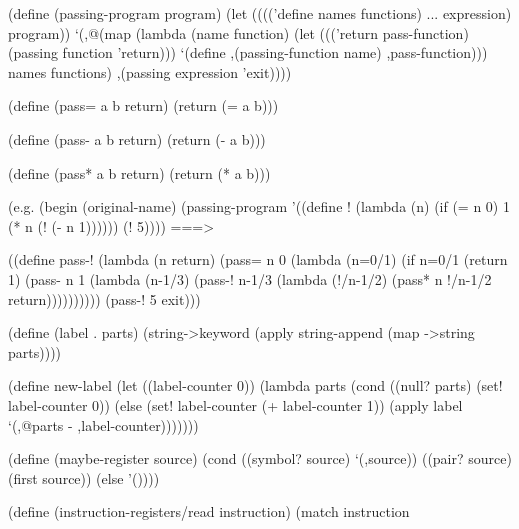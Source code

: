 \begin{Snippet}
(define (passing-program program)
  (let (((('define names functions) ... expression) program))
    `(,@(map (lambda (name function)
	       (let ((('return pass-function) (passing function 'return)))
		 `(define ,(passing-function name) ,pass-function)))
	     names functions)
      ,(passing expression 'exit))))
\end{Snippet}
\begin{Snippet}
(define (pass= a b return)
  (return (= a b)))
\end{Snippet}
\begin{Snippet}
(define (pass- a b return)
  (return (- a b)))
\end{Snippet}
\begin{Snippet}
(define (pass* a b return)
  (return (* a b)))
\end{Snippet}
\begin{Snippet}
(e.g.
 (begin
   (original-name)
   (passing-program '((define !
			(lambda (n)
			  (if (= n 0)
			      1
			      (* n (! (- n 1))))))
		      (! 5))))
 ===>
\end{Snippet}
\begin{Snippet}
 ((define pass-!
    (lambda (n return)
      (pass= n
	     0
	     (lambda (n=0/1)
	       (if n=0/1
		   (return 1)
		   (pass- n
			  1
			  (lambda (n-1/3)
			    (pass-!
			     n-1/3
			     (lambda (!/n-1/2)
			       (pass* n !/n-1/2 return))))))))))
  (pass-! 5 exit)))
\end{Snippet}
\begin{Snippet}
(define (label . parts)
  (string->keyword (apply string-append (map ->string parts))))
\end{Snippet}
\begin{Snippet}
(define new-label
  (let ((label-counter 0))
    (lambda parts
      (cond ((null? parts)
	     (set! label-counter 0))
	    (else
	     (set! label-counter (+ label-counter 1))
	     (apply label `(,@parts - ,label-counter)))))))
\end{Snippet}
\begin{Snippet}
(define (maybe-register source)
  (cond ((symbol? source)
	 `(,source))
	((pair? source)
	 (first source))
	(else
	 '())))
\end{Snippet}
\begin{Snippet}
(define (instruction-registers/read instruction)
  (match instruction
\end{Snippet}
